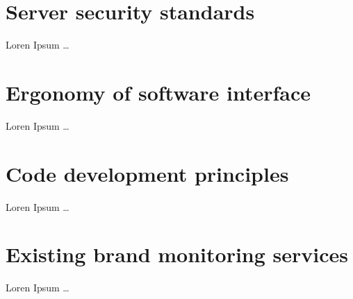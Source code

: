 \section{Server security standards}
Loren Ipsum \ldots

\section{Ergonomy of software interface}
Loren Ipsum \ldots

\section{Code development principles}
Loren Ipsum \ldots

\section{Existing brand monitoring services}
Loren Ipsum \ldots